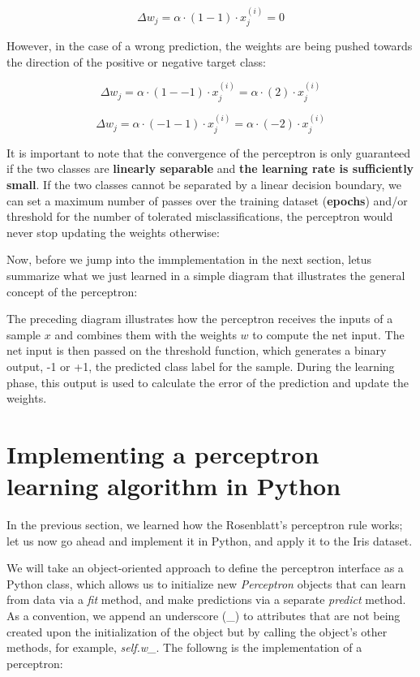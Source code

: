 \documentclass[11pt]{article}
\begin{document}
\[\Delta w_j = \alpha \cdot (1-1) \cdot x^{(i)}_j = 0\]

    However, in the case of a wrong prediction, the weights are being pushed
towards the direction of the positive or negative target class:

\[\Delta w_j = \alpha \cdot (1--1) \cdot x^{(i)}_j = \alpha \cdot (2) \cdot x^{(i)}_j\]

\[\Delta w_j = \alpha \cdot (-1-1) \cdot x^{(i)}_j = \alpha \cdot (-2) \cdot x^{(i)}_j\]

    It is important to note that the convergence of the perceptron is only
guaranteed if the two classes are \textbf{linearly separable} and
\textbf{the learning rate is sufficiently small}. If the two classes
cannot be separated by a linear decision boundary, we can set a maximum
number of passes over the training dataset (\textbf{epochs}) and/or
threshold for the number of tolerated misclassifications, the perceptron
would never stop updating the weights otherwise:

    Now, before we jump into the immplementation in the next section, letus
summarize what we just learned in a simple diagram that illustrates the
general concept of the perceptron:

    The preceding diagram illustrates how the perceptron receives the inputs
of a sample \(x\) and combines them with the weights \(w\) to compute
the net input. The net input is then passed on the threshold function,
which generates a binary output, -1 or +1, the predicted class label for
the sample. During the learning phase, this output is used to calculate
the error of the prediction and update the weights.

    \section{Implementing a perceptron learning algorithm in
Python}\label{implementing-a-perceptron-learning-algorithm-in-python}

    In the previous section, we learned how the Rosenblatt's perceptron rule
works; let us now go ahead and implement it in Python, and apply it to
the Iris dataset.

    We will take an object-oriented approach to define the perceptron
interface as a Python class, which allows us to initialize new
\emph{Perceptron} objects that can learn from data via a \emph{fit}
method, and make predictions via a separate \emph{predict} method. As a
convention, we append an underscore (\_) to attributes that are not
being created upon the initialization of the object but by calling the
object's other methods, for example, \emph{self.w\_}. The followng is
the implementation of a perceptron:
\end{document}
